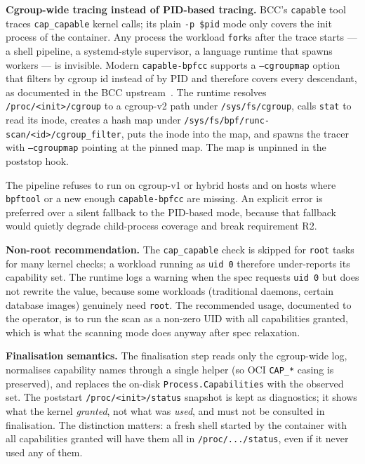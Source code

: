 \textbf{Cgroup-wide tracing instead of PID-based tracing.} BCC's \texttt{capable} tool traces \texttt{cap\_capable} kernel calls; its plain \texttt{-p \$pid} mode only covers the init process of the container. Any process the workload \texttt{fork}s after the trace starts --- a shell pipeline, a systemd-style supervisor, a language runtime that spawns workers --- is invisible. Modern \texttt{capable-bpfcc} supports a \texttt{--cgroupmap} option that filters by cgroup id instead of by PID and therefore covers every descendant, as documented in the BCC upstream~\cite{bcc2025}. The runtime resolves \texttt{/proc/<init>/cgroup} to a cgroup-v2 path under \texttt{/sys/fs/cgroup}, calls \texttt{stat} to read its inode, creates a hash map under \texttt{/sys/fs/bpf/runc-scan/<id>/cgroup\_filter}, puts the inode into the map, and spawns the tracer with \texttt{--cgroupmap} pointing at the pinned map. The map is unpinned in the poststop hook.

The pipeline refuses to run on cgroup-v1 or hybrid hosts and on hosts where \texttt{bpftool} or a new enough \texttt{capable-bpfcc} are missing. An explicit error is preferred over a silent fallback to the PID-based mode, because that fallback would quietly degrade child-process coverage and break requirement R2.

\textbf{Non-root recommendation.} The \texttt{cap\_capable} check is skipped for \texttt{root} tasks for many kernel checks; a workload running as \texttt{uid 0} therefore under-reports its capability set. The runtime logs a warning when the spec requests \texttt{uid 0} but does not rewrite the value, because some workloads (traditional daemons, certain database images) genuinely need \texttt{root}. The recommended usage, documented to the operator, is to run the scan as a non-zero UID with all capabilities granted, which is what the scanning mode does anyway after spec relaxation.

\textbf{Finalisation semantics.} The finalisation step reads only the cgroup-wide log, normalises capability names through a single helper (so OCI \texttt{CAP\_*} casing is preserved), and replaces the on-disk \texttt{Process.Capabilities} with the observed set. The poststart \texttt{/proc/<init>/status} snapshot is kept as diagnostics; it shows what the kernel \emph{granted}, not what was \emph{used}, and must not be consulted in finalisation. The distinction matters: a fresh shell started by the container with all capabilities granted will have them all in \texttt{/proc/.../status}, even if it never used any of them.

